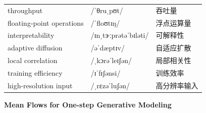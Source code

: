 \documentclass[UTF8,12pt,a4paper]{ctexart}
\providecommand{\zh}[1]{#1}
\begin{document}
\begin{tabular*}{\textwidth}{@{\extracolsep{\fill}}lll@{}}
throughput & {\ipafont /ˈθruˌpʊt/} & \zh{吞吐量} \\
floating-point operations & {\ipafont /ˈfloʊtɪŋ/} & \zh{浮点运算量} \\
interpretability & {\ipafont /ɪnˌtɝːprətəˈbɪləti/} & \zh{可解释性} \\
adaptive diffusion & {\ipafont /əˈdæptɪv/} & \zh{自适应扩散} \\
local correlation & {\ipafont /ˌkɔrəˈleɪʃən/} & \zh{局部相关性} \\
training efficiency & {\ipafont /ɪˈfɪʃənsi/} & \zh{训练效率} \\
high-resolution input & {\ipafont /ˌrɛzəˈluʃən/} & \zh{高分辨率输入} \\
\bottomrule
\end{tabular*}

\newpage

\begin{center}
    {\Large\bfseries Mean Flows for One-step Generative Modeling}
\end{center}
\end{document}
